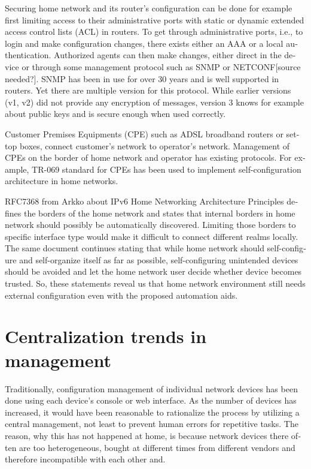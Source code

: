 \documentclass[12pt,a4paper,english]{tutthesis}
\begin{document}
\begin{otherlanguage}{english}
Securing home network and its router's configuration can be done for
example first limiting access to their administrative ports
with static or dynamic extended access control lists (ACL) in
routers. To get through administrative ports, i.e., to login and make
configuration changes, there exists either an AAA or a local authentication.
Authorized agents can then make changes, either direct in the device or through some
management protocol such as SNMP or NETCONF[source needed?].  SNMP has been in
use for over 30 years and is well supported in routers. Yet there are
multiple version for this protocol. While earlier versions (v1, v2)
did not provide any encryption of messages, version 3 knows for example
about public keys and is secure enough when used correctly.


Customer Premises Equipments (CPE) such as ADSL broadband routers or
set-top boxes, connect customer's network to operator's network.
Management of CPEs on the border of home network and operator has 
existing protocols. For example, TR-069 standard\cite{iptvtr069} for CPEs
has been used to implement self-configuration archi\-tecture in
home networks\cite{tr069rachidi2011}.


RFC7368\cite{rfc7368} from Arkko about IPv6 Home Networking Architecture Principles 
defines the borders of the home network and states that
internal borders in home network should possibly be automatically
discovered. Limiting those borders to specific
interface type would make it difficult to connect different realms locally.
The same document continues stating
that while home network should self-configure and self-organize itself as
far as possible, self-configuring unintended devices should be
avoided and let the home network user decide whether device becomes trusted.
So, these statements reveal us that home network environment still needs
external configuration even with the proposed automation aids.

\section{Centralization trends in management}
\label{sec-3-2}

Traditionally, configuration management of individual network devices has been done
using each device's console or web interface.  As the number of
devices has increased, it would have been reasonable to rationalize
the process by utilizing a central management, not least to prevent human
errors for repetitive tasks.  The reason, why this has not happened at
home, is because network devices there often are too heterogeneous, bought at different times from different vendors
and therefore incompatible with each other and.


\end{otherlanguage}
\end{document}
